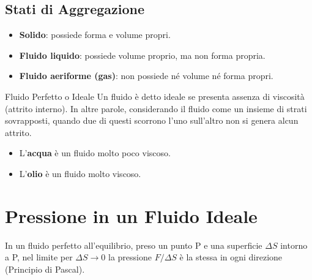 \subsection{Stati di Aggregazione}
\begin{itemize}
    \item \textbf{Solido}: possiede forma e volume propri.
    \item \textbf{Fluido liquido}: possiede volume proprio, ma non forma propria.
    \item \textbf{Fluido aeriforme (gas)}: non possiede né volume né forma propri.
\end{itemize}

\begin{definizione}{Fluido Perfetto o Ideale}
Un fluido è detto ideale se presenta assenza di viscosità (attrito interno). In altre parole, considerando il fluido come un insieme di strati sovrapposti, quando due di questi scorrono l'uno sull'altro non si genera alcun attrito.
\end{definizione}
\begin{itemize}
    \item L'\textbf{acqua} è un fluido molto poco viscoso.
    \item L'\textbf{olio} è un fluido molto viscoso.
\end{itemize}

\section{Pressione in un Fluido Ideale}
In un fluido perfetto all'equilibrio, preso un punto P e una superficie $\Delta S$ intorno a P, nel limite per $\Delta S \to 0$ la pressione $F/\Delta S$ è la stessa in ogni direzione (Principio di Pascal).

